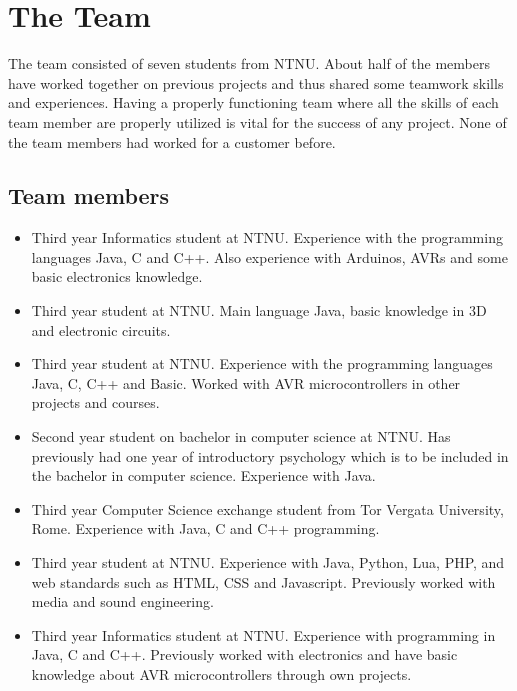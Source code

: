 \section{The Team}
The team consisted of seven students from NTNU. About half of the members have worked
together on previous projects and thus shared some teamwork skills and experiences.
Having a properly functioning team where all the skills of each team member are properly
utilized is vital for the success of any project. None of the team members had 
worked for a customer before.

\subsection{Team members}

\begin{itemize}
\item{\anders}\newline
Third year Informatics student at NTNU. Experience with the programming languages Java,
C and C++. Also experience with Arduinos, AVRs and some basic electronics knowledge.

\item{\henrik}\newline
Third year student at NTNU. Main language Java, basic knowledge in 3D and electronic circuits.

\item{\johan}\newline
Third year student at NTNU. Experience with the programming languages Java, C, C++  and
Basic. Worked with AVR microcontrollers in other projects and courses.

\item{\asbjorn}\newline
Second year student on bachelor in computer science at NTNU. Has previously had one year of
introductory psychology which is to be included in the bachelor in computer science.
Experience with Java.

\item{\emanuele}\newline
Third year Computer Science exchange student from Tor Vergata University, Rome.
Experience with Java, C and C++ programming.

\item{\jonas}\newline
Third year student at NTNU. Experience with Java, Python, Lua, PHP, and web standards such as HTML,
CSS and Javascript. Previously worked with media and sound engineering.

\item{\bjornar}\newline
Third year Informatics student at NTNU. Experience with programming in Java, C and C++.
Previously worked with electronics and have basic knowledge about AVR microcontrollers through
own projects.
\end{itemize}

